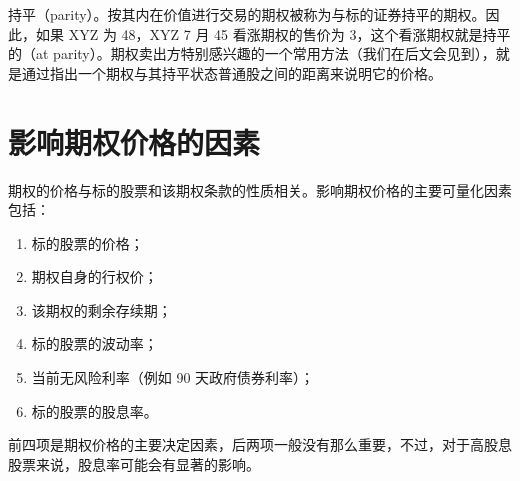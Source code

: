 持平（parity）。按其内在价值进行交易的期权被称为与标的证券持平的期权。因此，如果 XYZ 为 48，XYZ 7 月 45 看涨期权的售价为 3，这个看涨期权就是持平的（at parity）。期权卖出方特别感兴趣的一个常用方法（我们在后文会见到），就是通过指出一个期权与其持平状态普通股之间的距离来说明它的价格。
\section{影响期权价格的因素}
期权的价格与标的股票和该期权条款的性质相关。影响期权价格的主要可量化因素包括：
\begin{enumerate}
    \item 标的股票的价格；
    \item 期权自身的行权价；
    \item 该期权的剩余存续期；
    \item 标的股票的波动率；
    \item 当前无风险利率（例如 90 天政府债券利率）；
    \item 标的股票的股息率。
\end{enumerate}
前四项是期权价格的主要决定因素，后两项一般没有那么重要，不过，对于高股息股票来说，股息率可能会有显著的影响。
